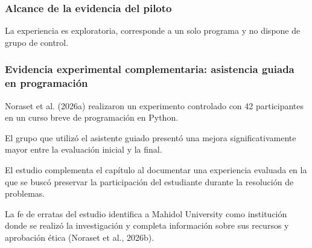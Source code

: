 \subsubsection*{Alcance de la evidencia del piloto} %

La experiencia es exploratoria, corresponde a un solo programa y no dispone de grupo de control. %

\subsubsection*{Evidencia experimental complementaria: asistencia guiada en programación} %

Noraset et al. (2026a) realizaron un experimento controlado con 42 participantes en un curso breve de programación en Python. %

El grupo que utilizó el asistente guiado presentó una mejora significativamente mayor entre la evaluación inicial y la final. %

El estudio complementa el capítulo al documentar una experiencia evaluada en la que se buscó preservar la participación del estudiante durante la resolución de problemas. %

La fe de erratas del estudio identifica a Mahidol University como institución donde se realizó la investigación y completa información sobre sus recursos y aprobación ética (Noraset et al., 2026b). %

